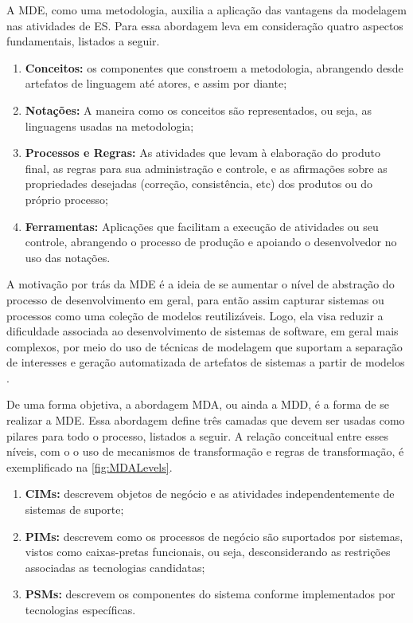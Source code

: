 A \ac{MDE}, como uma metodologia, auxilia a aplicação das vantagens da modelagem nas atividades de \ac{ES}. 
Para \cite{Brambilla:2017} essa abordagem leva em consideração quatro aspectos fundamentais, listados a seguir.

\begin{enumerate}
  \item \textbf{Conceitos:} os componentes que constroem a metodologia, abrangendo desde artefatos de linguagem até atores, e assim por diante;
  \item \textbf{Notações:} A maneira como os conceitos são representados, ou seja, as linguagens usadas na metodologia;
  \item \textbf{Processos e Regras:} As atividades que levam à elaboração do produto final, as regras para sua administração e controle, e as afirmações sobre as propriedades desejadas (correção, consistência, etc) dos produtos ou do próprio processo;
  \item \textbf{Ferramentas:} Aplicações que facilitam a execução de atividades ou seu controle, abrangendo o processo de produção e apoiando o desenvolvedor no uso das notações.
\end{enumerate}

A motivação por trás da \ac{MDE} é a ideia de se aumentar o nível de abstração do processo de desenvolvimento em geral, para então assim capturar sistemas ou processos como uma coleção de modelos reutilizáveis. 
Logo, ela visa reduzir a dificuldade associada ao desenvolvimento de sistemas de software, em geral mais complexos, por meio do uso de técnicas de modelagem que suportam a separação de interesses e geração automatizada de artefatos de sistemas a partir de modelos \cite{Kleppe:2003}.

De uma forma objetiva, a abordagem \ac{MDA}, ou ainda a \ac{MDD}, é a forma de se realizar a \ac{MDE}. 
Essa abordagem define três camadas que devem ser usadas como pilares para todo o processo, listados a seguir.
A relação conceitual entre esses níveis, com o o uso de mecanismos de transformação e regras de transformação, é exemplificado na \autoref{fig:MDALevels}.

\begin{enumerate}
    \item \textbf{\acp{CIM}:} descrevem objetos de negócio e as atividades independentemente de sistemas de suporte;
    \item \textbf{\acp{PIM}:} descrevem como os processos de negócio são suportados por sistemas, vistos como caixas-pretas funcionais, ou seja, desconsiderando as restrições associadas as tecnologias candidatas;
    \item \textbf{\acp{PSM}:} descrevem os componentes do sistema conforme implementados por tecnologias específicas.
\end{enumerate}

